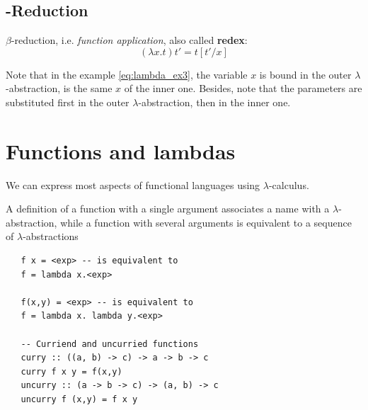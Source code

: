 \subsection*{\texorpdfstring{\bm{$\beta $}}{}-Reduction}
$\beta $-reduction, i.e. \textit{function application}, also called \textbf{redex}:
\[(\lambda x.t)t' = t[t'/x]\]

Note that in the example \ref{eq:lambda_ex3}, the variable $x$ is bound in the outer $\lambda$-abstraction, is the same $x$ of the inner one. Besides, note that the parameters are substituted first in the outer $\lambda$-abstraction, then in the inner one.

\section{Functions and lambdas}
We can express most aspects of functional languages using $\lambda$-calculus.

A definition of a function with a single argument
associates a name with a $\lambda$-abstraction,
while
a function with several arguments is equivalent to a
sequence of $\lambda$-abstractions
\begin{lstlisting}
   f x = <exp> -- is equivalent to
   f = lambda x.<exp>
   
   f(x,y) = <exp> -- is equivalent to
   f = lambda x. lambda y.<exp>

   -- Curriend and uncurried functions
   curry :: ((a, b) -> c) -> a -> b -> c
   curry f x y = f(x,y)
   uncurry :: (a -> b -> c) -> (a, b) -> c
   uncurry f (x,y) = f x y
\end{lstlisting}

